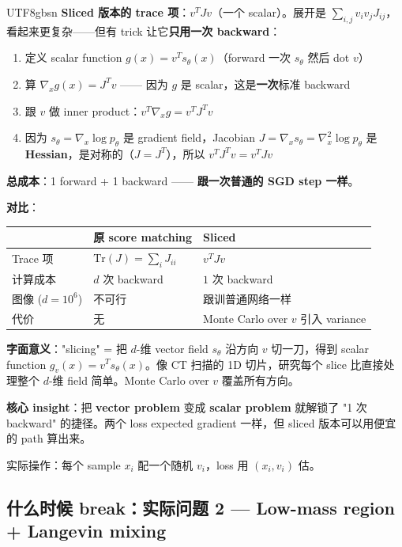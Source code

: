 \documentclass[11pt]{article}
\begin{document}
\begin{CJK}{UTF8}{gbsn}
\textbf{Sliced 版本的 trace 项}：$v^T J v$（一个 scalar）。展开是 $\sum_{i,j} v_i v_j J_{ij}$，看起来更复杂——但有 trick 让它\textbf{只用一次 backward}：
\begin{enumerate}[nosep]
  \item 定义 scalar function $g(x) = v^T s_\theta(x)$（forward 一次 $s_\theta$ 然后 dot $v$）
  \item 算 $\nabla_x g(x) = J^T v$ —— 因为 $g$ 是 scalar，这是\textbf{一次}标准 backward
  \item 跟 $v$ 做 inner product：$v^T \nabla_x g = v^T J^T v$
  \item 因为 $s_\theta = \nabla_x \log p_\theta$ 是 gradient field，Jacobian $J = \nabla_x s_\theta = \nabla_x^2 \log p_\theta$ 是 \textbf{Hessian}，是对称的（$J = J^T$），所以 $v^T J^T v = v^T J v$
\end{enumerate}
\textbf{总成本}：1 forward + 1 backward —— \textbf{跟一次普通的 SGD step 一样}。

\textbf{对比}：

\begin{center}
\begin{tabular}{|l|l|l|}
\hline
 & 原 score matching & Sliced \\
\hline
Trace 项 & $\text{Tr}(J) = \sum_i J_{ii}$ & $v^T J v$ \\
计算成本 & $d$ 次 backward & $1$ 次 backward \\
图像 ($d = 10^6$) & 不可行 & 跟训普通网络一样 \\
代价 & 无 & Monte Carlo over $v$ 引入 variance \\
\hline
\end{tabular}
\end{center}

\textbf{字面意义}："slicing" = 把 $d$-维 vector field $s_\theta$ 沿方向 $v$ 切一刀，得到 scalar function $g_v(x) = v^T s_\theta(x)$。像 CT 扫描的 1D 切片，研究每个 slice 比直接处理整个 $d$-维 field 简单。Monte Carlo over $v$ 覆盖所有方向。

\textbf{核心 insight}：把 \textbf{vector problem} 变成 \textbf{scalar problem} 就解锁了 "1 次 backward" 的捷径。两个 loss expected gradient 一样，但 sliced 版本可以用便宜的 path 算出来。

实际操作：每个 sample $x_i$ 配一个随机 $v_i$，loss 用 $(x_i, v_i)$ 估。

\subsection{什么时候 break：实际问题 2 --- Low-mass region + Langevin mixing}


\end{CJK}
\end{document}

